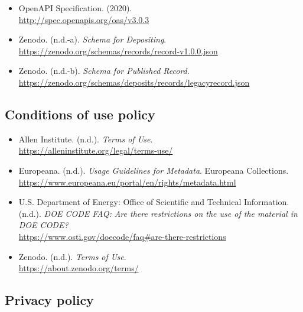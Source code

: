 \documentclass[11pt]{article}
\begin{document}
\begin{itemize}
\item OpenAPI Specification. (2020).\\
\url{http://spec.openapis.org/oas/v3.0.3}

\item Zenodo. (n.d.-a). \emph{Schema for Depositing}.\\
\url{https://zenodo.org/schemas/records/record-v1.0.0.json}

\item Zenodo. (n.d.-b). \emph{Schema for Published Record}.\\
\url{https://zenodo.org/schemas/deposits/records/legacyrecord.json}

\end{itemize}


\vspace*{-2pt}
\subsection{Conditions of use policy}
\label{conditions-of-use-policy}

\begin{itemize}

\item Allen Institute. (n.d.). \emph{Terms of Use}.\\
\url{https://alleninstitute.org/legal/terms-use/}

\item Europeana. (n.d.). \emph{Usage Guidelines for Metadata}. Europeana Collections.\\
\url{https://www.europeana.eu/portal/en/rights/metadata.html}

\item U.S. Department of Energy: Office of Scientific and Technical Information. (n.d.). \emph{DOE CODE FAQ: Are there restrictions on the use of the material in DOE CODE?}\\
\url{https://www.osti.gov/doecode/faq\#are-there-restrictions}

\item Zenodo. (n.d.). \emph{Terms of Use}.\\
\url{https://about.zenodo.org/terms/}

\end{itemize}


\subsection{Privacy policy}
\label{privacy-policy}
\end{document}
